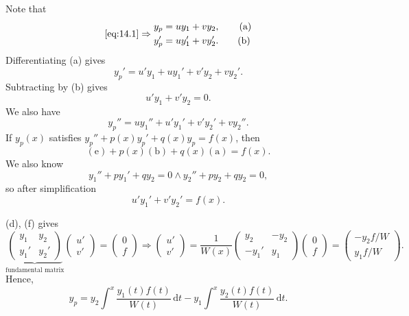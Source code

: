 \documentclass[a4paper]{article}
\begin{document}
    Note that
    \[
        \ref{eq:14.1}  \Rightarrow  
        \begin{aligned}
            y_p&=uy_1+vy_2,\qquad (\text{a})\\
            y_p'&=uy_1'+vy_2'.\qquad (\text{b})    
        \end{aligned}
    \]
    Differentiating (a) gives 
    \[
        y_p'=u'y_1+uy_1'+v'y_2+vy_2'\tag{c}
    .\]
    Subtracting by (b) gives 
    \[
        \boxed{u'y_1+v'y_2=0}\tag{d}
    .\]
    We also have 
    \[
        y_p''=uy_1''+u'y_1'+v'y_2'+vy_2''\tag{e}
    .\]
    If $ y_p(x) $ satisfies $ y_p''+p(x)y_p'+q(x)y_p=f(x) $, then 
    \[
        (\text{e})+p(x)(\text{b})+q(x)(\text{a})=f(x)
    .\]
    We also know 
    \[
        y_1''+py_1'+qy_2=0\land y_2''+py_2+qy_2=0,
    \]
    so after simplification
    \[
       \boxed{ u'y_1'+v'y_2'=f(x)}\tag{f}
    .\]

    (d), (f) gives 
    \[
        \underbrace{\begin{pmatrix}
            y_1&y_2\\
            y_1'&y_2'
        \end{pmatrix}}_{\text{fundamental matrix}}
        \begin{pmatrix}
            u'\\v'
        \end{pmatrix}
        =
        \begin{pmatrix}
            0\\f
        \end{pmatrix}
        \Longrightarrow 
        \begin{pmatrix}
            u'\\v'
        \end{pmatrix}=
        \frac{1}{W(x)}\begin{pmatrix}
            y_2&-y_2\\
            -y_1'&y_1
        \end{pmatrix}
        \begin{pmatrix}
            0\\f
        \end{pmatrix}
        =\begin{pmatrix}
            -y_2f/W\\ y_1f/W
        \end{pmatrix}
    .\]
    Hence, 
    \[
        \boxed{y_p = y_2 \int^{x} \frac{y_1(t)f(t)}{W(t)} \,\mathrm{d}t-y_1 \int^{x} \frac{y_2(t)f(t)}{W(t)} \,\mathrm{d}t}
    .\]
\end{document}
